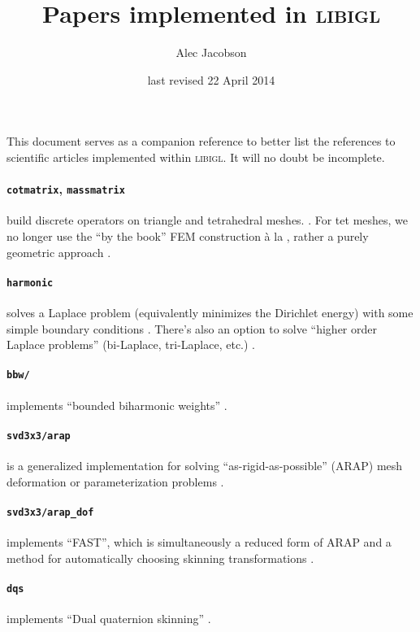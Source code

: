 \documentclass[12pt]{diary}
\title{Papers implemented in \textsc{libigl}}
\author{Alec Jacobson}
\date{last revised 22 April 2014}
\begin{document}
This document serves as a companion reference to better list the references to
scientific articles implemented within \textsc{libigl}. It will no doubt be
incomplete.

\paragraph{\texttt{cotmatrix}, \texttt{massmatrix}}
build discrete operators on triangle and tetrahedral meshes. 
\cite{Pinkall:1993:CDM,meyer03ddo,Jacobson:THESIS:2013}. For tet meshes, we no
longer use the ``by the book'' FEM construction \`a la \cite{Sharf:2007vv},
rather a purely geometric approach \cite{Barth:1994,Xu:1999}.

\paragraph{\texttt{harmonic}} solves a Laplace problem (equivalently
minimizes the Dirichlet energy) with some simple boundary conditions
\cite{HarmonicCoodinates07}. There's also an option to solve
``higher order Laplace problems'' (bi-Laplace, tri-Laplace, etc.)
\cite{Botsch:2004:AIF,sorkine04lsm,Jacobson:MixedFEM:2010}.

\paragraph{\texttt{bbw/}} implements ``bounded biharmonic
weights'' \cite{Jacobson:BBW:2011}.

\paragraph{\texttt{svd3x3/arap}} is a generalized implementation
for solving ``as-rigid-as-possible'' (ARAP) mesh deformation or parameterization
problems \cite{ARAP_modeling:2007,Liu:2008:ALA,Chao:2010:ASG}.

\paragraph{\texttt{svd3x3/arap\_dof}} implements ``FAST'',
which is simultaneously a reduced form of ARAP and a method for automatically
choosing skinning transformations \cite{Jacobson:FAST:2012}.

\paragraph{\texttt{dqs}} implements ``Dual quaternion skinning''
\cite{Kavan:2008:GSW}.
\end{document}
